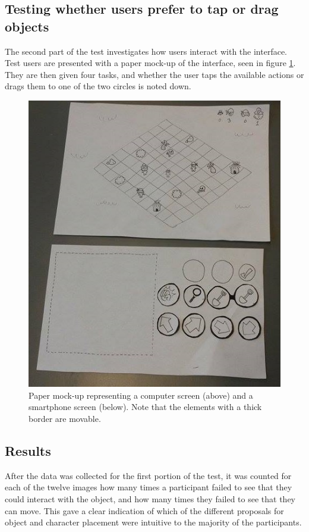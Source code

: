 \subsection{Testing whether users prefer to tap or drag objects}
The second part of the test investigates how users interact with the interface. Test users are presented with a paper mock-up of the interface, seen in figure \ref{fig:mockup}. They are then given four tasks, and whether the user taps the available actions or drags them to one of the two circles is noted down.

\begin{figure}[h!]
	\centering
	\includegraphics[scale=0.7]{figures/paper_1.jpg}
	\caption{Paper mock-up representing a computer screen (above) and a smartphone screen (below). Note that the elements with a thick border are movable. \label{fig:mockup}}
\end{figure}

\subsection{Results}
After the data was collected for the first portion of the test, it was counted for each of the twelve images how many times a participant failed to see that they could interact with the object, and how many times they failed to see that they can move. This gave a clear indication of which of the different proposals for object and character placement were intuitive to the majority of the participants.

